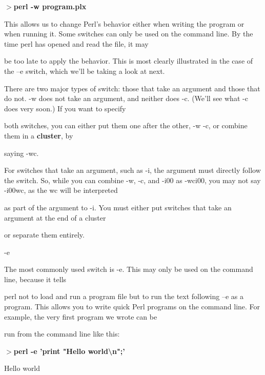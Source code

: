 \documentclass[a4paper,11pt]{book}
\begin{document}
\noindent 

\noindent $>$\textbf{perl -w program.plx}

\noindent 

\noindent This allows us to change Perl's behavior either when writing the program or when running it. Some switches can only be used on the command line. By the time perl has opened and read the file, it may

\noindent be too late to apply the behavior. This is most clearly illustrated in the case of the --e switch, which we'll be taking a look at next.

\noindent 

\noindent There are two major types of switch: those that take an argument and those that do not. -w does not take an argument, and neither does -c. (We'll see what -c does very soon.) If you want to specify

\noindent both switches, you can either put them one after the other, -w -c, or combine them in a \textbf{cluster}, by

\noindent saying -wc.

\noindent 

\noindent For switches that take an argument, such as -i, the argument must directly follow the switch. So, while you can combine -w, -c, and -i00 as -wci00, you may not say -i00wc, as the wc will be interpreted

\noindent as part of the argument to -i. You must either put switches that take an argument at the end of a cluster

\noindent or separate them entirely.

\noindent 

\noindent 

\noindent -e

\noindent 

\noindent The most commonly used switch is -e. This may only be used on the command line, because it tells

\noindent perl not to load and run a program file but to run the text following --e as a program. This allows you to write quick Perl programs on the command line. For example, the very first program we wrote can be

\noindent run from the command line like this:

\noindent 

\noindent $>$\textbf{perl -e 'print "Hello world\textbackslash n";'}

\noindent Hello world
\end{document}
